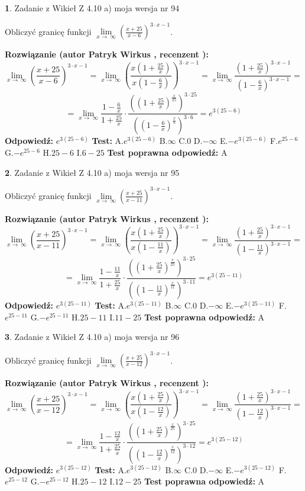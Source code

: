\documentclass[12pt, a4paper]{article}
\theoremstyle{definition} %
\newtheorem{zad}{}
\newcommand{\zadStart}[1]{\begin{zad}#1\newline}
\newcommand{\zadStop}{\end{zad}}
\newcommand{\rozwStart}[2]{\noindent \textbf{Rozwiązanie (autor #1 , recenzent #2): }\newline}
\newcommand{\rozwStop}{\newline}
\newcommand{\odpStart}{\noindent \textbf{Odpowiedź:}\newline}
\newcommand{\odpStop}{\newline}
\newcommand{\testStart}{\noindent \textbf{Test:}\newline}
\newcommand{\testStop}{\newline}
\newcommand{\kluczStart}{\noindent \textbf{Test poprawna odpowiedź:}\newline}
\newcommand{\kluczStop}{\newline}
\begin{document}
\zadStart{Zadanie z Wikieł Z 4.10 a) moja wersja nr 94}


Obliczyć granicę funkcji  $\lim\limits_{x\to\ \infty}(\frac{x+25}{x-6})^{3\cdot x-1}$.
\zadStop
\rozwStart{Patryk Wirkus}{}
$$\lim\limits_{x\to\ \infty}(\frac{x+25}{x-6})^{3\cdot x-1} = \lim\limits_{x\to\ \infty}(\frac{x(1+\frac{25}{x})}{x(1-\frac{6}{x})})^{3\cdot x-1}=\lim\limits_{x\to\ \infty}\frac{(1+\frac{25}{x})^{3\cdot x-1}}{(1-\frac{6}{x})^{3\cdot x-1}}=$$
$$=\lim\limits_{x\to\ \infty}\frac{1-\frac{6}{x}}{1+\frac{25}{x}}\cdot\frac{((1+\frac{25}{x})^{\frac{x}{25}})^{3\cdot25}}{((1-\frac{6}{x})^{\frac{x}{6}})^{3\cdot6}}=e^{3(25-6)}$$
\rozwStop
\odpStart
$e^{3(25-6)}$
\odpStop
\testStart
A.$e^{3(25-6)}$ B.$\infty$ C.$0$ D.$-\infty$ E.$-e^{3(25-6)}$
F.$e^{25-6}$ G.$-e^{25-6}$
H.$25-6$
I.$6-25$
\testStop
\kluczStart
A
\kluczStop



\zadStart{Zadanie z Wikieł Z 4.10 a) moja wersja nr 95}


Obliczyć granicę funkcji  $\lim\limits_{x\to\ \infty}(\frac{x+25}{x-11})^{3\cdot x-1}$.
\zadStop
\rozwStart{Patryk Wirkus}{}
$$\lim\limits_{x\to\ \infty}(\frac{x+25}{x-11})^{3\cdot x-1} = \lim\limits_{x\to\ \infty}(\frac{x(1+\frac{25}{x})}{x(1-\frac{11}{x})})^{3\cdot x-1}=\lim\limits_{x\to\ \infty}\frac{(1+\frac{25}{x})^{3\cdot x-1}}{(1-\frac{11}{x})^{3\cdot x-1}}=$$
$$=\lim\limits_{x\to\ \infty}\frac{1-\frac{11}{x}}{1+\frac{25}{x}}\cdot\frac{((1+\frac{25}{x})^{\frac{x}{25}})^{3\cdot25}}{((1-\frac{11}{x})^{\frac{x}{11}})^{3\cdot11}}=e^{3(25-11)}$$
\rozwStop
\odpStart
$e^{3(25-11)}$
\odpStop
\testStart
A.$e^{3(25-11)}$ B.$\infty$ C.$0$ D.$-\infty$ E.$-e^{3(25-11)}$
F.$e^{25-11}$ G.$-e^{25-11}$
H.$25-11$
I.$11-25$
\testStop
\kluczStart
A
\kluczStop



\zadStart{Zadanie z Wikieł Z 4.10 a) moja wersja nr 96}


Obliczyć granicę funkcji  $\lim\limits_{x\to\ \infty}(\frac{x+25}{x-12})^{3\cdot x-1}$.
\zadStop
\rozwStart{Patryk Wirkus}{}
$$\lim\limits_{x\to\ \infty}(\frac{x+25}{x-12})^{3\cdot x-1} = \lim\limits_{x\to\ \infty}(\frac{x(1+\frac{25}{x})}{x(1-\frac{12}{x})})^{3\cdot x-1}=\lim\limits_{x\to\ \infty}\frac{(1+\frac{25}{x})^{3\cdot x-1}}{(1-\frac{12}{x})^{3\cdot x-1}}=$$
$$=\lim\limits_{x\to\ \infty}\frac{1-\frac{12}{x}}{1+\frac{25}{x}}\cdot\frac{((1+\frac{25}{x})^{\frac{x}{25}})^{3\cdot25}}{((1-\frac{12}{x})^{\frac{x}{12}})^{3\cdot12}}=e^{3(25-12)}$$
\rozwStop
\odpStart
$e^{3(25-12)}$
\odpStop
\testStart
A.$e^{3(25-12)}$ B.$\infty$ C.$0$ D.$-\infty$ E.$-e^{3(25-12)}$
F.$e^{25-12}$ G.$-e^{25-12}$
H.$25-12$
I.$12-25$
\testStop
\kluczStart
A
\kluczStop
\end{document}
